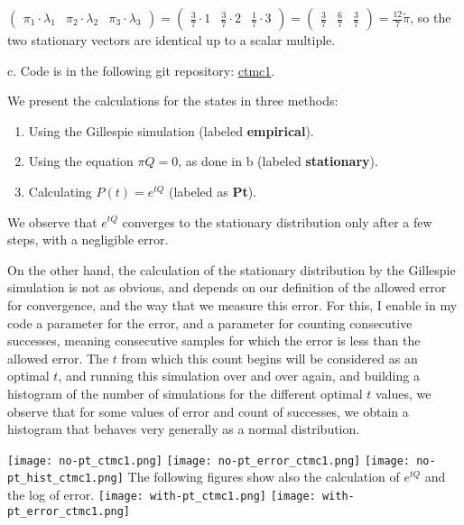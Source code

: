 \documentclass{article}
\begin{document}
$\begin{pmatrix}
    \pi_1\cdot\lambda_1 & \pi_2\cdot\lambda_2 & \pi_3\cdot\lambda_3
\end{pmatrix}=\begin{pmatrix}
    \frac{3}{7}\cdot{1} & \frac{3}{7}\cdot{2} & \frac{1}{7}\cdot{3}
\end{pmatrix}=\begin{pmatrix}
    \frac{3}{7} & \frac{6}{7} & \frac{3}{7}
\end{pmatrix}=\frac{12}{7}\tilde\pi$, so the two stationary vectors are identical up to a scalar multiple.

c. Code is in the following git repository: \href{https://github.com/HaimL76/ctmc1.git}{ctmc1}.

We present the calculations for the states in three methods:
\begin{enumerate}
    \item Using the Gillespie simulation (labeled \textbf{empirical}).
    \item Using the equation $\pi{Q}=0$, as done in b (labeled \textbf{stationary}).
    \item Calculating $P(t)=e^{tQ}$ (labeled as \textbf{Pt}).
\end{enumerate}

We observe that $e^{tQ}$ converges to the stationary distribution only after a few steps, with a negligible error. 

On the other hand, the calculation of the stationary distribution by the Gillespie simulation is not as obvious, and depends on our definition of the allowed error for convergence, and the way that we measure this error. For this, I enable in my code a parameter for the error, and a parameter for counting consecutive successes, meaning consecutive samples for which the error is less than the allowed error. The $t$ from which this count begins will be considered as an optimal $t$, and running this simulation over and over again, and building a histogram of the number of simulations for the different optimal $t$ values, we observe that for some values of error and count of successes, we obtain a histogram that behaves very generally as a normal distribution.

\texttt{[image: no-pt\_ctmc1.png]}
\texttt{[image: no-pt\_error\_ctmc1.png]}
\texttt{[image: no-pt\_hist\_ctmc1.png]}
\newpage
The following figures show also the calculation of $e^{tQ}$ and the log of error.
\texttt{[image: with-pt\_ctmc1.png]}
\texttt{[image: with-pt\_error\_ctmc1.png]}
\end{document}
